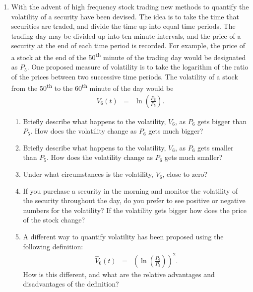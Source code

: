 \begin{enumerate}
  \clearpage

\item With the advent of high frequency stock trading new methods to
  quantify the volatility of a security have been devised. The idea is
  to take the time that securities are traded, and divide the time up
  into equal time periods. The trading day may be divided up into ten
  minute intervals, and the price of a security at the end of each
  time period is recorded. For example, the price of a stock at the
  end of the 50\textsuperscript{th} minute of the trading day would be
  designated as $P_5$. One proposed measure of volatility is to take
  the logarithm of the ratio of the prices between two successive time
  periods. The volatility of a stock from the 50\textsuperscript{th}
  to the 60\textsuperscript{th} minute of the day would be
  \begin{eqnarray*}
    V_6(t) & = & \ln\left(\frac{P_6}{P_5}\right).
  \end{eqnarray*}

  \begin{enumerate}
  \item Briefly describe what happens to the volatility, $V_6$, as
    $P_6$ gets bigger than $P_5$. How does the volatility change as
    $P_6$ gets much bigger?
    \vfill
  \item Briefly describe what happens to the volatility, $V_6$, as
    $P_6$ gets smaller than $P_5$. How does the volatility change as
    $P_6$ gets much smaller?
    \vfill
  \item Under what circumstances is the volatility, $V_6$, close to
    zero?
    \vfill
  \item If you purchase a security in the morning and monitor the
    volatility of the security throughout the day, do you prefer to
    see positive or negative numbers for the volatility? If the
    volatility gets bigger how does the price of the stock change?
    \vfill

  \item A different way to quantify volatility has been proposed using
    the following definition:
    \begin{eqnarray*}
      \hat{V}_6(t) & = & \left(\ln\left(\frac{P_6}{P_5}\right)\right)^2.
    \end{eqnarray*}
    How is this different, and what are the relative advantages and
    disadvantages of the definition?
    \vfill

  \end{enumerate}
  
\end{enumerate}

